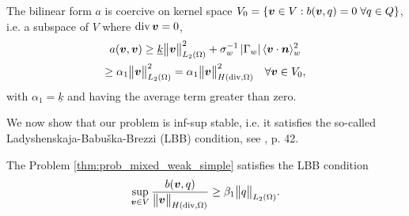 The bilinear form $a$ is coercive on kernel space $V_0=\{\mathbf{\boldsymbol{v}}\in V: b(\mathbf{\boldsymbol{v}},q)=0\;\forall q\in Q\}$, i.e.
a subspace of $V$ where ${\rm div}\,\mathbf{\boldsymbol{v}}=0$,
\begin{multline} \label{eqn:form_a_coercivity_V0}
    a(\mathbf{\boldsymbol{v}},\mathbf{\boldsymbol{v}}) \geq \underline{k} \bigl\Vert\mathbf{\boldsymbol{v}}\bigr\Vert^2_{L_2(\Omega)}
                + \sigma_w^{-1}\left|\Gamma_w\right|\langle\mathbf{\boldsymbol{v}}\cdot\mathbf{\boldsymbol{n}}\rangle_w^2 \\
        \geq  \alpha_1 \bigl\Vert\mathbf{\boldsymbol{v}}\bigr\Vert^2_{L_2(\Omega)} = \alpha_1 \bigl\Vert\mathbf{\boldsymbol{v}}\bigr\Vert^2_{H({\rm div},\Omega)} \quad \forall \mathbf{\boldsymbol{v}}\in V_0,
\end{multline}
with $\alpha_1=\underline{k}$ and having the average term greater than zero.

We now show that our problem is inf-sup stable, i.e. it satisfies 
the so-called Ladyshenskaja-Babu{\v s}ka-Brezzi (LBB) condition, see \cite{brezzi_mixed_1991}, p. 42.

\begin{lemma} \label{lem:mixed_lbb}
The Problem \ref{thm:prob_mixed_weak_simple} satisfies the LBB condition
\begin{equation} \label{eqn:form_b_lbb}
    \sup_{\mathbf{\boldsymbol{v}}\in V} \frac{b(\mathbf{\boldsymbol{v}},q)}{\bigl\Vert\mathbf{\boldsymbol{v}}\bigr\Vert_{H({\rm div},\Omega)}} \geq \beta_1 \bigl\Vert q\bigr\Vert_{L_2(\Omega)}.
\end{equation}
\end{lemma}

